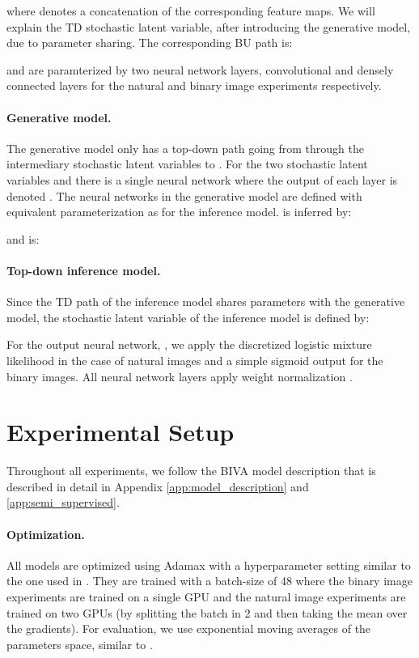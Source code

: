 \documentclass{article}
\def\nm{BIVA\xspace}
\begin{document}
where  denotes a concatenation of the corresponding feature maps. We will explain the TD stochastic latent variable,  after introducing the generative model, due to parameter sharing. The corresponding BU path is:

 and  are paramterized by two neural network layers, convolutional and densely connected layers for the natural and binary image experiments respectively.

\paragraph{Generative model.} The generative model only has a top-down path going from  through the intermediary stochastic latent variables to . For the two stochastic latent variables  and  there is a single neural network  where the output of each layer is denoted . The neural networks in the generative model are defined with equivalent parameterization as for the inference model.  is inferred by:

and  is:

\paragraph{Top-down inference model.} Since the TD path of the inference model shares parameters with the generative model, the  stochastic latent variable of the inference model is defined by:

For the output neural network, , we apply the discretized logistic mixture likelihood in the case of natural images and a simple sigmoid output for the binary images. All neural network layers apply weight normalization \citep{Salimans2016a}.
\fi


\section{Experimental Setup}\label{app:experimental_setup}
Throughout all experiments, we follow the \nm model description that is described in detail in Appendix \ref{app:model_description} and \ref{app:semi_supervised}.

\paragraph{Optimization.} All models are optimized using Adamax \citep{Kingma14a} with a hyperparameter setting similar to the one used in \citep{Kingma2016}. They are trained with a batch-size of 48 where the binary image experiments are trained on a single GPU and the natural image experiments are trained on two GPUs (by splitting the batch in 2 and then taking the mean over the gradients). For evaluation, we use exponential moving averages of the parameters space, similar to \citep{Kingma2016,Salimans17}.
\end{document}
